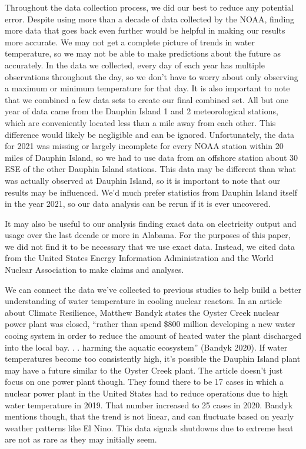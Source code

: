 \documentclass[
  letterpaper,
  DIV=11,
  numbers=noendperiod]{scrreprt}
\begin{document}
Throughout the data collection process, we did our best to reduce any
potential error. Despite using more than a decade of data collected by
the NOAA, finding more data that goes back even further would be helpful
in making our results more accurate. We may not get a complete picture
of trends in water temperature, so we may not be able to make
predictions about the future as accurately. In the data we collected,
every day of each year has multiple observations throughout the day, so
we don't have to worry about only observing a maximum or minimum
temperature for that day. It is also important to note that we combined
a few data sets to create our final combined set. All but one year of
data came from the Dauphin Island 1 and 2 meteorological stations, which
are conveniently located less than a mile away from each other. This
difference would likely be negligible and can be ignored. Unfortunately,
the data for 2021 was missing or largely incomplete for every NOAA
station within 20 miles of Dauphin Island, so we had to use data from an
offshore station about 30 ESE of the other Dauphin Island stations. This
data may be different than what was actually observed at Dauphin Island,
so it is important to note that our results may be influenced. We'd much
prefer statistics from Dauphin Island itself in the year 2021, so our
data analysis can be rerun if it is ever uncovered.

It may also be useful to our analysis finding exact data on electricity
output and usage over the last decade or more in Alabama. For the
purposes of this paper, we did not find it to be necessary that we use
exact data. Instead, we cited data from the United States Energy
Information Administration and the World Nuclear Association to make
claims and analyses.

We can connect the data we've collected to previous studies to help
build a better understanding of water temperature in cooling nuclear
reactors. In an article about Climate Resilience, Matthew Bandyk states
the Oyster Creek nuclear power plant was closed, ``rather than spend
\$800 million developing a new water cooing system in order to reduce
the amount of heated water the plant discharged into the local bay. . .
harming the aquatic ecosystem'' (Bandyk 2020). If water temperatures
become too consistently high, it's possible the Dauphin Island plant may
have a future similar to the Oyster Creek plant. The article doesn't
just focus on one power plant though. They found there to be 17 cases in
which a nuclear power plant in the United States had to reduce
operations due to high water temperature in 2019. That number increased
to 25 cases in 2020. Bandyk mentions though, that the trend is not
linear, and can fluctuate based on yearly weather patterns like El Nino.
This data signals shutdowns due to extreme heat are not as rare as they
may initially seem.
\end{document}
